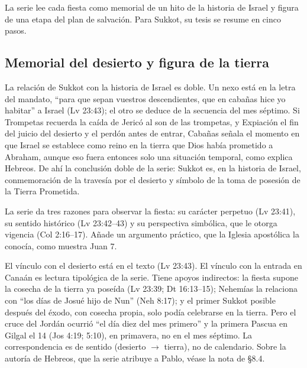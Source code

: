 \documentclass[11pt,letterpaper]{article}
\begin{document}
La serie lee cada fiesta como memorial de un hito de la historia de Israel y figura de una etapa del plan de salvación. Para Sukkot, su tesis se resume en cinco pasos.

\subsection{Memorial del desierto y figura de la tierra}
La relación de Sukkot con la historia de Israel es doble. Un nexo está en la letra del mandato, ``para que sepan vuestros descendientes, que en cabañas hice yo habitar'' a Israel (Lv 23:43); el otro se deduce de la secuencia del mes séptimo. Si Trompetas recuerda la caída de Jericó al son de las trompetas, y Expiación el fin del juicio del desierto y el perdón antes de entrar, Cabañas señala el momento en que Israel se establece como reino en la tierra que Dios había prometido a Abraham, aunque eso fuera entonces solo una situación temporal, como explica Hebreos. De ahí la conclusión doble de la serie: Sukkot es, en la historia de Israel, conmemoración de la travesía por el desierto y símbolo de la toma de posesión de la Tierra Prometida.

La serie da tres razones para observar la fiesta: su carácter perpetuo (Lv 23:41), su sentido histórico (Lv 23:42--43) y su perspectiva simbólica, que le otorga vigencia (Col 2:16--17). Añade un argumento práctico, que la Iglesia apostólica la conocía, como muestra Juan 7.

\begin{nota}[Precisión]
El vínculo con el desierto está en el texto (Lv 23:43). El vínculo con la entrada en Canaán es lectura tipológica de la serie. Tiene apoyos indirectos: la fiesta supone la cosecha de la tierra ya poseída (Lv 23:39; Dt 16:13--15); Nehemías la relaciona con ``los días de Josué hijo de Nun'' (Neh 8:17); y el primer Sukkot posible después del éxodo, con cosecha propia, solo podía celebrarse en la tierra. Pero el cruce del Jordán ocurrió ``el día diez del mes primero'' y la primera Pascua en Gilgal el 14 (Jos 4:19; 5:10), en primavera, no en el mes séptimo. La correspondencia es de sentido (desierto $\rightarrow$ tierra), no de calendario. Sobre la autoría de Hebreos, que la serie atribuye a Pablo, véase la nota de §8.4.
\end{nota}
\end{document}
